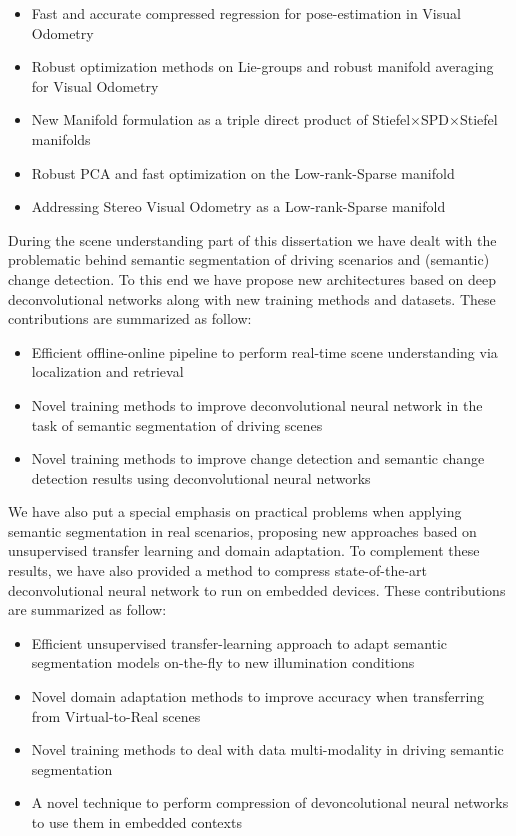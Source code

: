 \begin{itemize}
\item Fast and accurate compressed regression for pose-estimation in Visual Odometry
\item Robust optimization methods on Lie-groups and robust manifold averaging for Visual Odometry
\item New Manifold formulation as a triple direct product of Stiefel$\times$SPD$\times$Stiefel manifolds
\item Robust PCA and fast optimization on the Low-rank-Sparse manifold
\item Addressing Stereo Visual Odometry as a Low-rank-Sparse manifold
\end{itemize}

During the scene understanding part of this dissertation we have dealt with the problematic behind semantic segmentation of driving scenarios and (semantic) change detection. To this end we have propose new architectures based on deep deconvolutional networks along with new training methods and datasets. These contributions are summarized as follow:

\begin{itemize}
\item Efficient offline-online pipeline to perform real-time scene understanding via localization and retrieval
\item Novel training methods to improve deconvolutional neural network in the task of semantic segmentation of driving scenes
\item Novel training methods to improve change detection and semantic change detection results using deconvolutional neural networks
\end{itemize}

We have also put a special emphasis on practical problems when applying semantic segmentation in real scenarios, proposing new approaches based on unsupervised transfer learning and domain adaptation. To complement these results, we have also provided a method to compress state-of-the-art deconvolutional neural network to run on embedded devices. These contributions are summarized as follow:

\begin{itemize}
\item Efficient unsupervised transfer-learning approach to adapt semantic segmentation models on-the-fly to new illumination conditions
\item Novel domain adaptation methods to improve accuracy when transferring from Virtual-to-Real scenes
\item Novel training methods to deal with data multi-modality in driving semantic segmentation
\item A novel technique to perform compression of devoncolutional neural networks to use them in embedded contexts 
\end{itemize}




